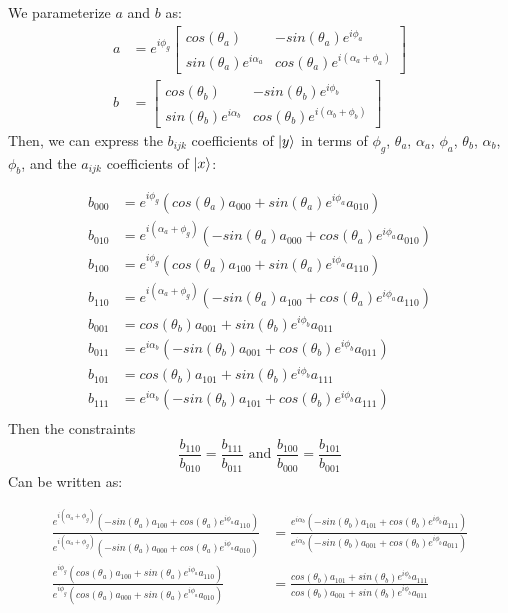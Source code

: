 We parameterize $a$ and $b$ as:
\begin{align}
a &= e^{i\phi_g}\begin{bmatrix}cos(\theta_a)&-sin(\theta_a)e^{i\phi_a}\\
  sin(\theta_a)e^{i\alpha_a}&cos(\theta_a)e^{i(\alpha_a + \phi_a)}\end{bmatrix} 
  \nonumber \\
b &= \begin{bmatrix}cos(\theta_b)&-sin(\theta_b)e^{i\phi_b}\\
  sin(\theta_b)e^{i\alpha_b}&cos(\theta_b)e^{i(\alpha_b + \phi_b)}\end{bmatrix}
\end{align}
Then, we can express the $b_{ijk}$ coefficients of $\mathinner{|{y}\rangle}$ in terms of
$\phi_g$, $\theta_a$, $\alpha_a$, $\phi_a$, $\theta_b$, $\alpha_b$, $\phi_b$,
and the $a_{ijk}$ coefficients of $\mathinner{|{x}\rangle}$:

\begin{align}
b_{000} &= e^{i\phi_g}(cos(\theta_a)a_{000} + sin(\theta_a)e^{i\phi_a}a_{010}) 
  \nonumber \\
b_{010} &= e^{i(\alpha_a + \phi_g)}(-sin(\theta_a)a_{000} +
  cos(\theta_a)e^{i\phi_a}a_{010}) \nonumber \\
b_{100} &= e^{i\phi_g}(cos(\theta_a)a_{100} + sin(\theta_a)e^{i\phi_a}a_{110}) 
  \nonumber \\
b_{110} &= e^{i(\alpha_a + \phi_g)}(-sin(\theta_a)a_{100} +
  cos(\theta_a)e^{i\phi_a}a_{110}) \nonumber \\
b_{001} &= cos(\theta_b)a_{001} + sin(\theta_b)e^{i\phi_b}a_{011} \nonumber \\
b_{011} &= e^{i\alpha_b}(-sin(\theta_b)a_{001} + cos(\theta_b)e^{i\phi_b}a_{011}) 
  \nonumber \\
b_{101} &= cos(\theta_b)a_{101} + sin(\theta_b)e^{i\phi_b}a_{111} \nonumber \\
b_{111} &= e^{i\alpha_b}(-sin(\theta_b)a_{101} + cos(\theta_b)e^{i\phi_b}a_{111})
  \nonumber \\
\end{align}
Then the constraints
\begin{equation}
\frac{b_{110}}{b_{010}} = \frac{b_{111}}{b_{011}} 
  \text{ and }\frac{b_{100}}{b_{000}} = \frac{b_{101}}{b_{001}}
\end{equation}
Can be written as:

\begin{align}
\frac{e^{i(\alpha_a + \phi_g)}(-sin(\theta_a)a_{100} + cos(\theta_a)e^{i\phi_a}a_{110})}{e^{i(\alpha_a + \phi_g)}(-sin(\theta_a)a_{000} + cos(\theta_a)e^{i\phi_a}a_{010})} &= 
\frac{e^{i\alpha_b}(-sin(\theta_b)a_{101} + cos(\theta_b)e^{i\phi_b}a_{111})}{e^{i\alpha_b}(-sin(\theta_b)a_{001} + cos(\theta_b)e^{i\phi_b}a_{011})} \nonumber \\
\frac{e^{i\phi_g}(cos(\theta_a)a_{100} + sin(\theta_a)e^{i\phi_a}a_{110})}{e^{i\phi_g}(cos(\theta_a)a_{000} + sin(\theta_a)e^{i\phi_a}a_{010})} &= \frac{cos(\theta_b)a_{101} + sin(\theta_b)e^{i\phi_b}a_{111}}
{cos(\theta_b)a_{001} + sin(\theta_b)e^{i\phi_b}a_{011}}
\end{align}

